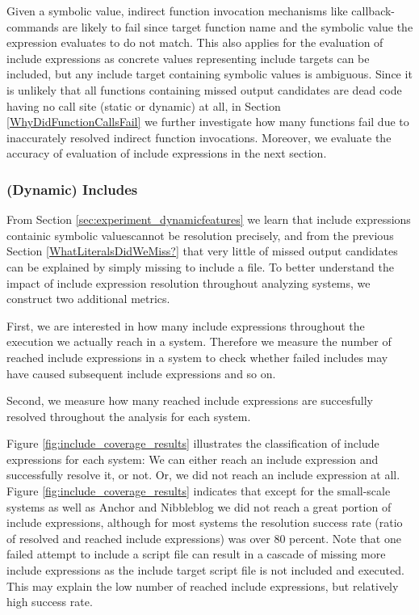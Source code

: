 \documentclass[sigconf]{acmart}
\renewcommand{\sf}[1]{\textsf{#1}}
\begin{document}
Given a symbolic value, indirect function invocation mechanisms like
callback-commands are likely to fail since target function name and the symbolic
value the expression evaluates to do not match.
This also applies for the evaluation of include expressions as concrete values
representing include targets can be included, but any include target containing
symbolic values is ambiguous. Since it is unlikely that all functions containing
missed output candidates are dead code having no call site (static or dynamic)
at all, in Section \ref{WhyDidFunctionCallsFail} we further investigate how
many functions fail due to inaccurately resolved indirect function invocations.
Moreover, we evaluate the accuracy of evaluation of include expressions in the next section.

\subsubsection{(Dynamic) Includes}
\label{WhyDidIncludesFail}
From Section \ref{sec:experiment_dynamicfeatures} we learn that include
expressions containic symbolic valuescannot be resolution precisely, and from
the previous Section \ref{WhatLiteralsDidWeMiss?} that very little of missed
output candidates can be explained by simply missing to include a file. To
better understand the impact of include expression resolution throughout
analyzing systems, we construct two additional metrics.

First, we are interested in how many include expressions throughout the
execution we actually reach in a system. Therefore we measure the number of
reached include expressions in a system to check whether failed includes may
have caused subsequent include expressions and so on. 

Second, we measure how many reached include expressions are
succesfully resolved throughout the analysis for each system.

Figure \ref{fig:include_coverage_results} illustrates the classification of
include expressions for each system: We can either reach an include expression
and successfully resolve it, or not. Or, we did not reach an include expression at all. 
Figure \ref{fig:include_coverage_results} indicates that except for the
small-scale systems as well as \sf{Anchor} and \sf{Nibbleblog} we did not
reach a great portion of include expressions, although for most systems the
resolution success rate (ratio of resolved and reached include expressions) was
over 80 percent. Note that one failed attempt to include a script file can 
result in a cascade of missing more include expressions as the include target
script file is not included and executed. This may explain the low number of
reached include expressions, but relatively high success rate.
\end{document}
